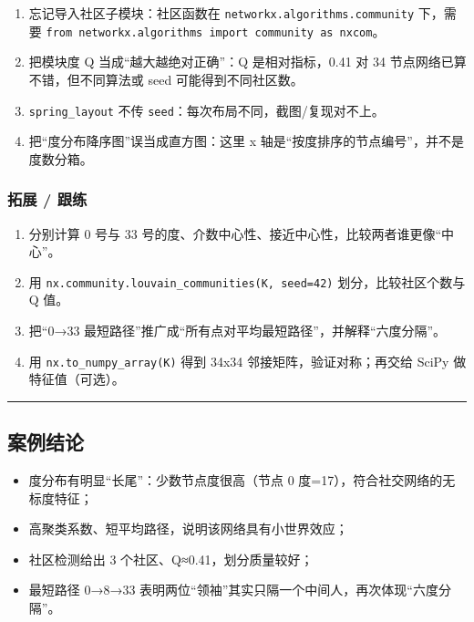 \begin{enumerate}
\def\labelenumi{\arabic{enumi}.}
\tightlist
\item
  忘记导入社区子模块：社区函数在 \texttt{networkx.algorithms.community}
  下，需要
  \texttt{from\ networkx.algorithms\ import\ community\ as\ nxcom}。
\item
  把模块度 Q 当成``越大越绝对正确''：Q 是相对指标，0.41 对 34
  节点网络已算不错，但不同算法或 seed 可能得到不同社区数。
\item
  \texttt{spring\_layout} 不传
  \texttt{seed}：每次布局不同，截图/复现对不上。
\item
  把``度分布降序图''误当成直方图：这里 x
  轴是``按度排序的节点编号''，并不是度数分箱。
\end{enumerate}

\subsubsection{拓展 / 跟练}\label{ux62d3ux5c55-ux8ddfux7ec3-15}

\begin{enumerate}
\def\labelenumi{\arabic{enumi}.}
\tightlist
\item
  分别计算 0 号与 33
  号的度、介数中心性、接近中心性，比较两者谁更像``中心''。
\item
  用 \texttt{nx.community.louvain\_communities(K,\ seed=42)}
  划分，比较社区个数与 Q 值。
\item
  把``0→33
  最短路径''推广成``所有点对平均最短路径''，并解释``六度分隔''。
\item
  用 \texttt{nx.to\_numpy\_array(K)} 得到 34x34
  邻接矩阵，验证对称；再交给 SciPy 做特征值（可选）。
\end{enumerate}

\begin{center}\rule{0.5\linewidth}{0.5pt}\end{center}

\subsection{案例结论}\label{ux6848ux4f8bux7ed3ux8bba}

\begin{itemize}
\tightlist
\item
  度分布有明显``长尾''：少数节点度很高（节点 0
  度=17），符合社交网络的无标度特征；
\item
  高聚类系数、短平均路径，说明该网络具有小世界效应；
\item
  社区检测给出 3 个社区、Q≈0.41，划分质量较好；
\item
  最短路径 0→8→33
  表明两位``领袖''其实只隔一个中间人，再次体现``六度分隔''。
\end{itemize}

